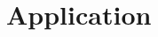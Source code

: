 \documentclass{article}[11pt]
\providecommand{\DIFdelend}{} %
\DeclareRobustCommand{\DIFdelend}{\DIFOaddend \let\includegraphics\DIFOincludegraphics} %
\begin{document}






\DIFdelend \section{Application}
\end{document}
